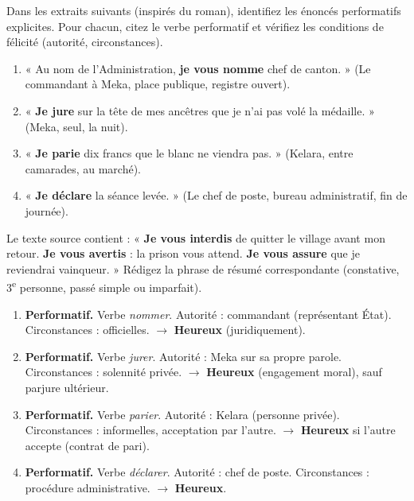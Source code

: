 \documentclass[11pt]{article}
\newcounter{popsec}
\newcounter{popsub}
\newcommand{\courssub}[1]{%
  \stepcounter{popsub}%
  \par\vspace{9pt}\noindent{\popxbold\fontsize{11.5}{13}\selectfont\color{popink}{\color{poporange}\thepopsec.\thepopsub}\hspace{6pt}#1}\par\nopagebreak\vspace{4pt}
}
\begin{document}
\courssub{Exercices d'intégration}

\begin{exercice}
Dans les extraits suivants (inspirés du roman), identifiez les énoncés performatifs explicites. Pour chacun, citez le verbe performatif et vérifiez les conditions de félicité (autorité, circonstances).
\begin{enumerate}
    \item « Au nom de l'Administration, \textbf{je vous nomme} chef de canton. » (Le commandant à Meka, place publique, registre ouvert).
    \item « \textbf{Je jure} sur la tête de mes ancêtres que je n'ai pas volé la médaille. » (Meka, seul, la nuit).
    \item « \textbf{Je parie} dix francs que le blanc ne viendra pas. » (Kelara, entre camarades, au marché).
    \item « \textbf{Je déclare} la séance levée. » (Le chef de poste, bureau administratif, fin de journée).
\end{enumerate}
\end{exercice}

\begin{exercice}
Le texte source contient : « \textbf{Je vous interdis} de quitter le village avant mon retour. \textbf{Je vous avertis} : la prison vous attend. \textbf{Je vous assure} que je reviendrai vainqueur. »
Rédigez la phrase de résumé correspondante (constative, 3\textsuperscript{e} personne, passé simple ou imparfait).
\end{exercice}

\begin{corrige}[Exercice 1]
\begin{enumerate}
    \item \textbf{Performatif.} Verbe \emph{nommer}. Autorité : commandant (représentant État). Circonstances : officielles. $\rightarrow$ \textbf{Heureux} (juridiquement).
    \item \textbf{Performatif.} Verbe \emph{jurer}. Autorité : Meka sur sa propre parole. Circonstances : solennité privée. $\rightarrow$ \textbf{Heureux} (engagement moral), sauf parjure ultérieur.
    \item \textbf{Performatif.} Verbe \emph{parier}. Autorité : Kelara (personne privée). Circonstances : informelles, acceptation par l'autre. $\rightarrow$ \textbf{Heureux} si l'autre accepte (contrat de pari).
    \item \textbf{Performatif.} Verbe \emph{déclarer}. Autorité : chef de poste. Circonstances : procédure administrative. $\rightarrow$ \textbf{Heureux}.
\end{enumerate}
\end{corrige}
\end{document}

